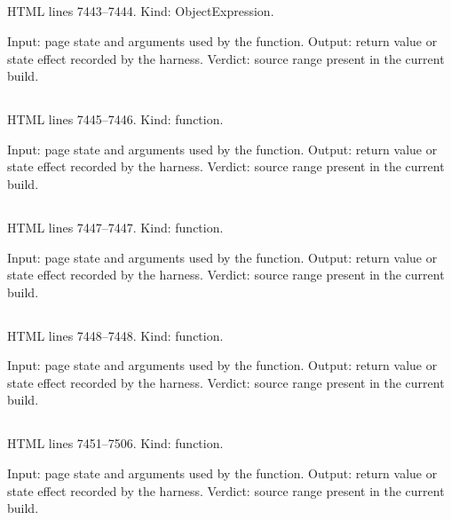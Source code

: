 \subsection*{\texttt{}}
\label{vf_377_MG_PICT}
HTML lines 7443--7444. Kind: ObjectExpression.

Input: page state and arguments used by the function.
Output: return value or state effect recorded by the harness.
Verdict: source range present in the current build.

\subsection*{\texttt{}}
\label{vf_378_mgIt}
HTML lines 7445--7446. Kind: function.

Input: page state and arguments used by the function.
Output: return value or state effect recorded by the harness.
Verdict: source range present in the current build.

\subsection*{\texttt{}}
\label{vf_379_mgSafe}
HTML lines 7447--7447. Kind: function.

Input: page state and arguments used by the function.
Output: return value or state effect recorded by the harness.
Verdict: source range present in the current build.

\subsection*{\texttt{}}
\label{vf_380_mgTxt}
HTML lines 7448--7448. Kind: function.

Input: page state and arguments used by the function.
Output: return value or state effect recorded by the harness.
Verdict: source range present in the current build.

\subsection*{\texttt{}}
\label{vf_381_mgViewLoad}
HTML lines 7451--7506. Kind: function.

Input: page state and arguments used by the function.
Output: return value or state effect recorded by the harness.
Verdict: source range present in the current build.

